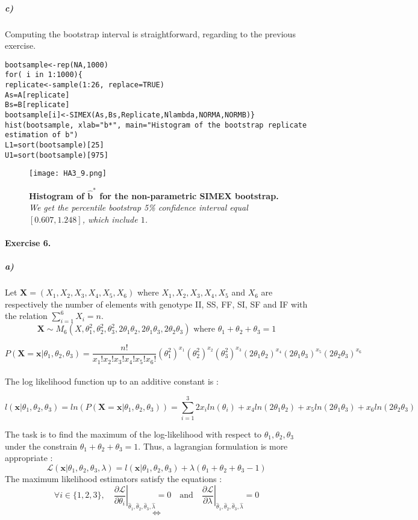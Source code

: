 \documentclass{article}
\begin{document}
\subparagraph{c)}
Computing the bootstrap interval is straightforward, regarding to the previous exercise. 

\begin{footnotesize}
\begin{verbatim}
bootsample<-rep(NA,1000)
for( i in 1:1000){
replicate<-sample(1:26, replace=TRUE)
As=A[replicate]
Bs=B[replicate]
bootsample[i]<-SIMEX(As,Bs,Replicate,Nlambda,NORMA,NORMB)}
hist(bootsample, xlab="b*", main="Histogram of the bootstrap replicate estimation of b")
L1=sort(bootsample)[25]
U1=sort(bootsample)[975]
\end{verbatim}
\end{footnotesize}

\begin{figure}[H]
	  \centering
  	\texttt{[image: HA3\_9.png]}
  	\caption{\textbf{Histogram of  $\pmb{\widehat{b}^*}$ for the non-parametric SIMEX bootstrap.} \textsl{We get the percentile bootstrap 5\% confidence interval equal $[0.607,1.248]$, which include $1$.}}
	\end{figure}
	
	

\paragraph{Exercise 6.}
\subparagraph{a)}

Let $\pmb{X}=(X_1,X_2,X_3,X_4,X_5,X_6)$ where $X_1,X_2,X_3,X_4,X_5$ and $X_6$ are respectively the number of elements with genotype II, SS, FF, SI, SF and IF with the relation $\sum_{i=1}^6X_i=n$. 
$$\pmb{X} \sim M_6(X,\theta_1^2,\theta_2^2,\theta_3^2,2 \theta_1 \theta_2,2\theta_1\theta_3,2\theta_2\theta_3) \text{ where  $\theta_1+\theta_2+\theta_3=1$} $$ 

$$ P(\pmb{X}=\pmb{x}|\theta_1,\theta_2,\theta_3)=\dfrac{n!}{x_1!x_2!x_3!x_4!x_5!x_6!}(\theta_1^2)^{x_1}(\theta_2^2)^{x_2}(\theta_3^2)^{x_3}(2 \theta_1 \theta_2)^{x_4}(2\theta_1\theta_3)^{x_5}(2\theta_2\theta_3)^{x_6}$$\\

The log likelihood function up to an additive constant is :

$$l(\pmb{x}|\theta_1,\theta_2,\theta_3)=ln(P(\pmb{X}=\pmb{x}|\theta_1,\theta_2,\theta_3))=\sum_{i=1}^3 2x_i ln(\theta_i) + x_4ln(2\theta_1 \theta_2)+x_5 ln(2\theta_1 \theta_3)+x_6 ln(2\theta_2 \theta_3)$$

The task is to find the maximum of the log-likelihood with respect to $\theta_1,\theta_2,\theta_3$ under the constrain $\theta_1+\theta_2+\theta_3=1$. Thus, a lagrangian formulation is more appropriate :
$$\mathcal{L}(\pmb{x}|\theta_1,\theta_2,\theta_3,\lambda)=l(\pmb{x}|\theta_1,\theta_2,\theta_3)+\lambda(\theta_1+\theta_2+\theta_3-1)$$
The maximum likelihood estimators satisfy the equations :
$$ \forall i \in \{1,2,3\}, \quad \left. \dfrac{\partial\mathcal{L}}{\partial \theta_i} \right|_{\widehat{\theta}_1 , \widehat{\theta}_2,\widehat{\theta}_3,\widehat{\lambda}} =0 \quad \text{and} \quad
\left. \dfrac{\partial\mathcal{L}}{\partial \lambda} \right|_{\widehat{\theta}_1 , \widehat{\theta}_2,\widehat{\theta}_3,\widehat{\lambda}}=0$$
$$\iff$$
\end{document}
